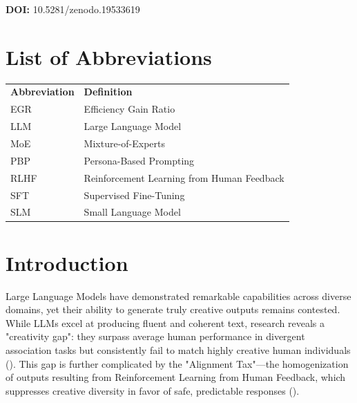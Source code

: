 \documentclass{article}
\begin{document}
\begin{abstract}
These findings demonstrate that persona effectiveness is contingent on model architecture and task domain, and establish the economic viability of small models with personas for novelty generation. For practitioners, the path forward is not to seek a single "best" persona, but to match the right persona to the right model for the right task.

\textbf{Keywords:} Large Language Models, Cultural Personas, Novelty, Cross-Architecture Evaluation, Cost-Performance Analysis
\end{abstract}

\noindent\textbf{DOI:} 10.5281/zenodo.19533619
\section*{List of Abbreviations}

\begin{center}
\begin{tabular}{ll}
\textbf{Abbreviation} & \textbf{Definition} \\
EGR & Efficiency Gain Ratio \\
LLM & Large Language Model \\
MoE & Mixture-of-Experts \\
PBP & Persona-Based Prompting \\
RLHF & Reinforcement Learning from Human Feedback \\
SFT & Supervised Fine-Tuning \\
SLM & Small Language Model \\
\end{tabular}
\end{center}

\section{Introduction}

Large Language Models have demonstrated remarkable capabilities across diverse domains, yet their ability to generate truly creative outputs remains contested. While LLMs excel at producing fluent and coherent text, research reveals a "creativity gap": they surpass average human performance in divergent association tasks but consistently fail to match highly creative human individuals (\cite{ antoine_bellemare_pepin_a5621579, vikram_arora_67282d96}). This gap is further complicated by the "Alignment Tax"—the homogenization of outputs resulting from Reinforcement Learning from Human Feedback, which suppresses creative diversity in favor of safe, predictable responses (\cite{ behnam_mohammadi_78154429,michael_ryan_c7257c47}).
\end{document}

